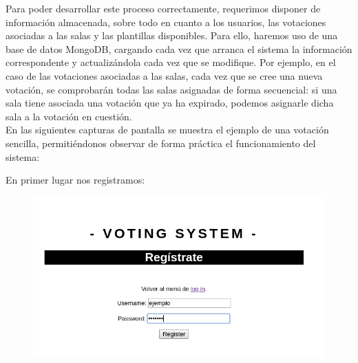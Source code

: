 \documentclass{article}
\begin{document}
 	Para poder desarrollar este proceso correctamente, requerimos disponer de información almacenada, sobre todo en cuanto a los usuarios, las votaciones asociadas a las salas y las plantillas disponibles. Para ello, haremos uso de una base de datos MongoDB, cargando cada vez que arranca el sistema la información correspondente y actualizándola cada vez que se modifique. Por ejemplo, en el caso de las votaciones asociadas a las salas, cada vez que se cree una nueva votación, se comprobarán todas las salas asignadas de forma secuencial: si una sala tiene asociada una votación que ya ha expirado, podemos asignarle dicha sala a la votación en cuestión. \\
 
 	En las siguientes capturas de pantalla se muestra el ejemplo de una votación sencilla, permitiéndonos observar de forma práctica el funcionamiento del sistema:
 	\newpage
 	
 	En primer lugar nos registramos:
 	\begin{figure}[H]
 		\centering
 		\includegraphics[totalheight=6.5cm]{img/cap6}
 		\caption{}
 	\end{figure}
 ~\\
 
\end{document}
